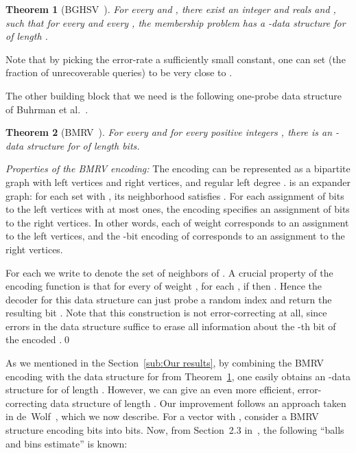 \documentclass[11pt,english]{article}
\newtheorem{theorem}{Theorem}
\theoremstyle{definition}
\theoremstyle{remark}
\begin{document}
\begin{theorem}[BGHSV~\cite{bghsv04}]\label{thm:bghsv}For every
 and , there exist an integer 
and reals  and , such that for every 
and every , the membership problem 
has a -data structure for 
of length . \end{theorem}

Note that by picking the error-rate  a sufficiently small
constant, one can set  (the fraction of unrecoverable queries) to be very close to .

The other building block that we need is the following one-probe data
structure of Buhrman et al.~\cite{bmrv:bitvectorsj}.

\begin{theorem}[BMRV~\cite{bmrv:bitvectorsj}]\label{thm:bmrv}
For every  and for every positive integers ,
there is an -data structure for  of length
 bits. \end{theorem}

\emph{Properties of the BMRV encoding:} The encoding can be represented
as a bipartite graph  with  left vertices
and  right vertices, and regular left degree .
 is an expander graph: for each set  with
, its neighborhood  satisfies .
For each assignment of bits to the left vertices with at most 
ones, the encoding specifies an assignment of bits to the right vertices.
In other words, each  of weight  corresponds
to an assignment to the left vertices, and the -bit encoding of
 corresponds to an assignment to the right vertices.

For each  we write  to denote
the set of neighbors of . A crucial property of the encoding function
 is that for every  of weight , for each
, if  then .
Hence the decoder for this data structure can just probe a random
index  and return the resulting bit . Note
that this construction is not error-correcting at all, since 
errors in the data structure suffice to erase all information about
the -th bit of the encoded .\qed

\medskip

As we mentioned in the Section~\ref{sub:Our results}, by combining
the BMRV encoding with the data structure for  from Theorem~\ref{thm:bghsv},
one easily obtains an -data structure 
for  of length .
However, we can give an even more efficient, error-correcting data
structure of length . Our improvement follows 
an approach taken in de~Wolf~\cite{wolf:ecdata}, which
we now describe. For a vector  with ,
consider a BMRV structure encoding  bits into  bits. Now,
from Section~2.3 in~\cite{wolf:ecdata}, the following ``balls
and bins estimate'' is known:
\end{document}
